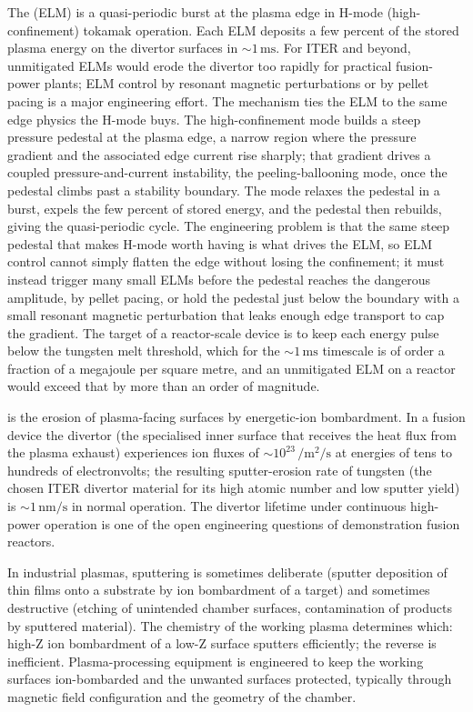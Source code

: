The  (ELM) is a quasi-periodic burst at
the plasma edge in H-mode (high-confinement) tokamak operation.
Each ELM deposits a few percent of the stored plasma energy on the
divertor surfaces in $\sim 1\,\si{\milli\second}$. For ITER and
beyond, unmitigated ELMs would erode the divertor too rapidly for
practical fusion-power plants; ELM control by resonant magnetic
perturbations or by pellet pacing is a major engineering effort. The
mechanism ties the ELM to the same edge physics the H-mode buys. The
high-confinement mode builds a steep pressure pedestal at the plasma
edge, a narrow region where the pressure gradient and the associated
edge current rise sharply; that gradient drives a coupled
pressure-and-current instability, the peeling-ballooning mode, once the
pedestal climbs past a stability boundary. The mode relaxes the pedestal
in a burst, expels the few percent of stored energy, and the pedestal
then rebuilds, giving the quasi-periodic cycle. The engineering problem
is that the same steep pedestal that makes H-mode worth having is what
drives the ELM, so ELM control cannot simply flatten the edge without
losing the confinement; it must instead trigger many small ELMs before
the pedestal reaches the dangerous amplitude, by pellet pacing, or hold
the pedestal just below the boundary with a small resonant magnetic
perturbation that leaks enough edge transport to cap the gradient. The
target of a reactor-scale device is to keep each energy pulse below the
tungsten melt threshold, which for the $\sim 1\,\si{\milli\second}$
timescale is of order a fraction of a megajoule per square metre, and an
unmitigated ELM on a reactor would exceed that by more than an order of
magnitude.

 is the erosion of plasma-facing surfaces by
energetic-ion bombardment. In a fusion device the divertor (the
specialised inner surface that receives the heat flux from the
plasma exhaust) experiences ion fluxes of $\sim 10^{23}\,\si{\per
\meter\squared\per\second}$ at energies of tens to hundreds of
electronvolts; the resulting sputter-erosion rate of tungsten (the
chosen ITER divertor material for its high atomic number and low
sputter yield) is $\sim 1\,\si{\nano\meter\per\second}$ in normal
operation. The divertor lifetime under continuous high-power
operation is one of the open engineering questions of demonstration
fusion reactors.

In industrial plasmas, sputtering is sometimes deliberate (sputter
deposition of thin films onto a substrate by ion bombardment of a
target) and sometimes destructive (etching of unintended chamber
surfaces, contamination of products by sputtered material). The
chemistry of the working plasma determines which: high-Z ion
bombardment of a low-Z surface sputters efficiently; the reverse is
inefficient. Plasma-processing equipment is engineered to keep the
working surfaces ion-bombarded and the unwanted surfaces protected,
typically through magnetic field configuration and the geometry of
the chamber.

